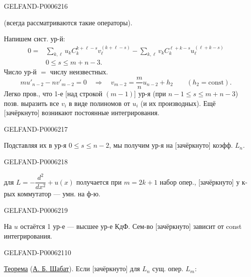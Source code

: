 \begin{GelfandAdjacentEvidence}{GELFAND-P000621}{6}

(всегда рассматриваются такие операторы).

Напишем сист. ур-й:
\[
\begin{aligned}
0={}&\sum_{k,\ell}u_k C_k^{k+\ell-s}v_\ell^{(k+\ell-s)}
-\sum_{k,\ell}v_k C_k^{\ell+k-s}u_\ell^{(\ell+k-s)}\\
&0\le s\le m+n-3.
\end{aligned}
\]
Число ур-й \(=\) числу неизвестных.
\[
mu'_{n-2}-nv'_{m-2}=0
\quad\Rightarrow\quad
v_{m-2}=\frac mn u_{n-2}+h_2\qquad(h_2=\mathrm{const}).
\]
Легко пров., что 1-е [над строкой \((m-1)\)] ур-я
(при \(n-1\le s\le m+n-3\)) позв. выразить все \(v_i\) в виде полиномов от \(u_i\)
(и их производных). Ещё [зачёркнуто] возникают постоянные интегрирования.
\end{GelfandAdjacentEvidence}
\begin{GelfandAdjacentEvidence}{GELFAND-P000621}{7}

Подставляя их в ур-я \(0\le s\le n-2\), мы получим ур-я на [зачёркнуто] коэфф. \(L_n\).
\end{GelfandAdjacentEvidence}
\begin{GelfandAdjacentEvidence}{GELFAND-P000621}{8}


для \(L=-\dfrac{d^2}{dx^2}+u(x)\) получается при \(m=2k+1\) набор опер.,
[зачёркнуто] у к-рых коммутатор — умн. на ф-ю.
\end{GelfandAdjacentEvidence}
\begin{GelfandAdjacentEvidence}{GELFAND-P000621}{9}

На \(u\) остаётся 1 ур-е — высшее ур-е КдФ.
Сем-во [зачёркнуто] зависит от const интегрирования.
\end{GelfandAdjacentEvidence}
\begin{GelfandAdjacentEvidence}{GELFAND-P000621}{10}


\underline{Теорема} (\underline{А. Б. Шабат}). Если [зачёркнуто]
для \(L_n\) сущ. опер. \(L_m\):
\end{GelfandAdjacentEvidence}


